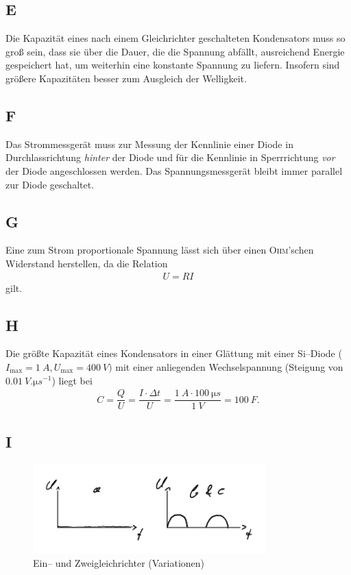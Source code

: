 \documentclass[a4paper,10pt]{article}
\numberwithin{equation}{section}
\begin{document}
\subsection{E}
Die Kapazität eines nach einem Gleichrichter geschalteten Kondensators muss so groß sein, dass sie über die Dauer, die die Spannung abfällt, ausreichend Energie gespeichert hat, um weiterhin eine konstante Spannung zu liefern.
Insofern sind größere Kapazitäten besser zum Ausgleich der Welligkeit.

\subsection{F}
Das Strommessgerät muss zur Messung der Kennlinie einer Diode in Durchlassrichtung \textit{hinter} der Diode und für die Kennlinie in Sperrrichtung \textit{vor} der Diode angeschlossen werden.
Das Spannungsmessgerät bleibt immer parallel zur Diode geschaltet.

\subsection{G}
Eine zum Strom proportionale Spannung lässt sich über einen \textsc{Ohm}'schen Widerstand herstellen, da die Relation
\begin{align} 
        U=RI
\end{align} 
gilt.

\subsection{H}
Die größte Kapazität eines Kondensators in einer Glättung mit einer Si--Diode ($I_{\text{max}}=\SI{1}{A}, U_{\text{max}}=\SI{400}{V})$ mit einer anliegenden Wechselspannung (Steigung von $\SI{0.01}{V.\micro s ^{-1}}$) liegt bei
\begin{align} 
        C=\dfrac{Q}{U}=\dfrac{I\cdot \Delta t}{U}=\dfrac{\SI{1}{A}\cdot \SI{100}{\micro s}}{\SI{1}{V}}=\SI{100}{F}
.\end{align} 

\subsection{I}
\begin{figure}[h]
        \centering
        \includegraphics[width=0.8\textwidth]{I_crop.pdf}
        \caption[Ein-- und Zweigleichrichter (Variationen)]{Ein-- und Zweigleichrichter (Variationen)}
\end{figure}
\end{document}
